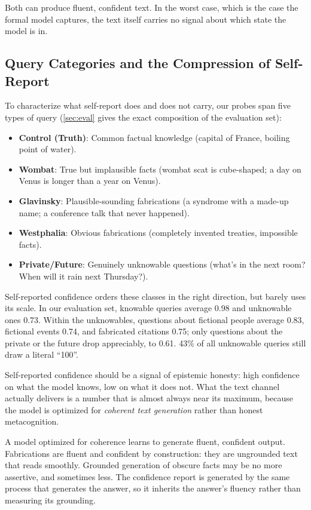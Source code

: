 \documentclass[11pt]{article}
\begin{document}
Both can produce fluent, confident text. In the worst case, which is the case the formal model captures, the text itself carries no signal about which state the model is in.

\subsection{Query Categories and the Compression of Self-Report}

To characterize what self-report does and does not carry, our probes span five types of query (\autoref{sec:eval} gives the exact composition of the evaluation set):
\begin{itemize}
    \item \textbf{Control (Truth)}: Common factual knowledge (capital of France, boiling point of water).
    \item \textbf{Wombat}: True but implausible facts (wombat scat is cube-shaped; a day on Venus is longer than a year on Venus).
    \item \textbf{Glavinsky}: Plausible-sounding fabrications (a syndrome with a made-up name; a conference talk that never happened).
    \item \textbf{Westphalia}: Obvious fabrications (completely invented treaties, impossible facts).
    \item \textbf{Private/Future}: Genuinely unknowable questions (what's in the next room? When will it rain next Thursday?).
\end{itemize}

Self-reported confidence orders these classes in the right direction, but barely uses its scale. In our evaluation set, knowable queries average 0.98 and unknowable ones 0.73. Within the unknowables, questions about fictional people average 0.83, fictional events 0.74, and fabricated citations 0.75; only questions about the private or the future drop appreciably, to 0.61. 43\% of all unknowable queries still draw a literal ``100''.

Self-reported confidence should be a signal of epistemic honesty: high confidence on what the model knows, low on what it does not. What the text channel actually delivers is a number that is almost always near its maximum, because the model is optimized for \emph{coherent text generation} rather than honest metacognition.

A model optimized for coherence learns to generate fluent, confident output. Fabrications are fluent and confident by construction: they are ungrounded text that reads smoothly. Grounded generation of obscure facts may be no more assertive, and sometimes less. The confidence report is generated by the same process that generates the answer, so it inherits the answer's fluency rather than measuring its grounding.
\end{document}
